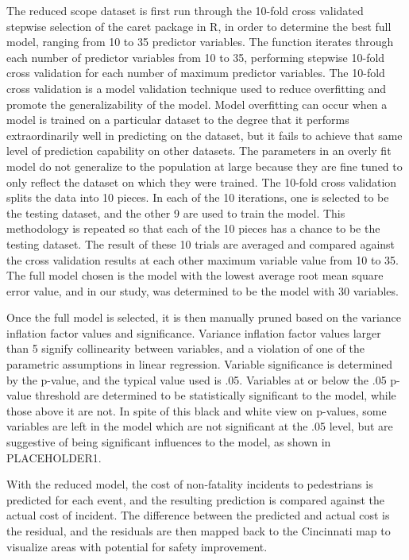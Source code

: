 \documentclass{llncs}
\begin{document}
The reduced scope dataset is first run through the 10-fold cross validated stepwise selection of the caret package in R, in order to determine the best full model, ranging from 10 to 35 predictor variables. The function iterates through each number of predictor variables from 10 to 35, performing stepwise 10-fold cross validation for each number of maximum predictor variables. The 10-fold cross validation is a model validation technique used to reduce overfitting and promote the generalizability of the model. Model overfitting can occur when a model is trained on a particular dataset to the degree that it performs extraordinarily well in predicting on the dataset, but it fails to achieve that same level of prediction capability on other datasets. The parameters in an overly fit model do not generalize to the population at large because they are fine tuned to only reflect the dataset on which they were trained. The 10-fold cross validation splits the data into 10 pieces. In each of the 10 iterations, one is selected to be the testing dataset, and the other 9 are used to train the model. This methodology is repeated so that each of the 10 pieces has a chance to be the testing dataset. The result of these 10 trials are averaged and compared against the cross validation results at each other maximum variable value from 10 to 35. The full model chosen is the model with the lowest average root mean square error value, and in our study, was determined to be the model with 30 variables.

Once the full model is selected, it is then manually pruned based on the variance inflation factor values and significance. Variance inflation factor values larger than 5 signify collinearity between variables, and a violation of one of the parametric assumptions in linear regression. Variable significance is determined by the p-value, and the typical value used is .05. Variables at or below the .05 p-value threshold are determined to be statistically significant to the model, while those above it are not. In spite of this black and white view on p-values, some variables are left in the model which are not significant at the .05 level, but are suggestive of being significant influences to the model, as shown in PLACEHOLDER1. 

With the reduced model, the cost of non-fatality incidents to pedestrians is predicted for each event, and the resulting prediction is compared against the actual cost of incident. The difference between the predicted and actual cost is the residual, and the residuals are then mapped back to the Cincinnati map to visualize areas with potential for safety improvement.
\end{document}

